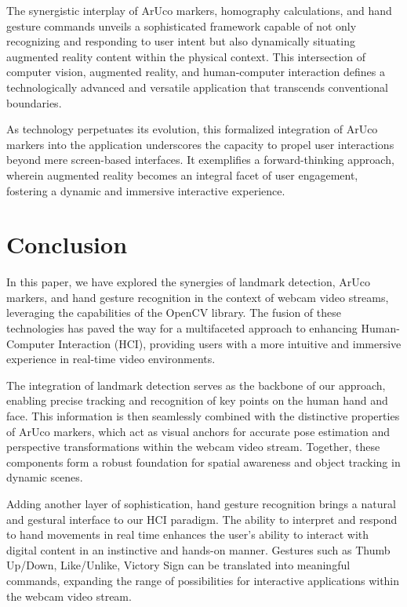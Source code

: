 \documentclass[journal]{IEEEtran}
\begin{document}
The synergistic interplay of ArUco markers, homography calculations, and hand gesture commands unveils a sophisticated framework 
capable of not only recognizing and responding to user intent but also dynamically situating augmented reality content within the 
physical context. This intersection of computer vision, augmented reality, and human-computer interaction defines a technologically 
advanced and versatile application that transcends conventional boundaries.

As technology perpetuates its evolution, this formalized integration of ArUco markers into the application underscores the capacity 
to propel user interactions beyond mere screen-based interfaces. It exemplifies a forward-thinking approach, wherein augmented reality 
becomes an integral facet of user engagement, fostering a dynamic and immersive interactive experience.



\section{Conclusion}
In this paper, we have explored the synergies of landmark detection, ArUco markers, and hand gesture recognition in the context 
of webcam video streams, leveraging the capabilities of the OpenCV library. The fusion of these technologies has paved the way for 
a multifaceted approach to enhancing Human-Computer Interaction (HCI), providing users with a more intuitive and immersive 
experience in real-time video environments.

The integration of landmark detection serves as the backbone of our approach, enabling precise tracking and recognition of 
key points on the human hand and face. This information is then seamlessly combined with the distinctive properties of ArUco markers, 
which act as visual anchors for accurate pose estimation and perspective transformations within the webcam video stream. Together, 
these components form a robust foundation for spatial awareness and object tracking in dynamic scenes.

Adding another layer of sophistication, hand gesture recognition brings a natural and gestural interface to our HCI paradigm. 
The ability to interpret and respond to hand movements in real time enhances the user's ability to interact with digital content 
in an instinctive and hands-on manner. Gestures such as Thumb Up/Down, Like/Unlike, Victory Sign can be translated into meaningful
commands, expanding the range of possibilities for interactive applications within the webcam video stream.
\end{document}
